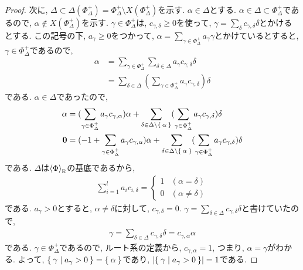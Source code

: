 \begin{proof}
  次に, $\Delta\subset \Delta(\Phi_\Delta^{+})=\Phi_\Delta^+\setminus X(\Phi_\Delta^+)$を示す.
  $\alpha\in\Delta$とする.
  $\alpha\in\Delta \subset \Phi_\Delta^+$であるので,
  $\alpha\not\in X(\Phi_\Delta^+)$を示す.
  $\gamma\in\Phi_\Delta^+$は,
  $c_{\gamma,\delta}\geq 0$を使って,
  $\gamma=\sum_{\delta}c_{\gamma,\delta}\delta$とかけるとする.
  この記号の下,
  $a_\gamma\geq 0$をつかって,
  $\alpha=\sum_{\gamma\in\Phi_\Delta^+}a_\gamma\gamma$とかけているとすると,
  $\gamma\in \Phi_\Delta^+$であるので,
  \begin{align*}
    \alpha
    &=\sum_{\gamma\in\Phi_\Delta^+}\sum_{\delta\in\Delta}a_\gamma c_{\gamma,\delta}\delta\\
    &=\sum_{\delta\in\Delta}(\sum_{\gamma\in\Phi_\Delta^+}a_\gamma c_{\gamma,\delta})\delta
  \end{align*}
  である. $\alpha\in\Delta$であったので,
  \begin{align*}
    \alpha
    &=
    (\sum_{\gamma\in\Phi_\Delta^+}a_\gamma c_{\gamma,\alpha})\alpha
    +\sum_{\delta\in\Delta\setminus\Set{\alpha}}(\sum_{\gamma\in\Phi_\Delta^+}a_\gamma c_{\gamma,\delta})\delta\\
    \boldsymbol{0}
    &=
    (-1+\sum_{\gamma\in\Phi_\Delta^+}a_\gamma c_{\gamma,\alpha})\alpha
    +\sum_{\delta\in\Delta\setminus\Set{\alpha}}(\sum_{\gamma\in\Phi_\Delta^+}a_\gamma c_{\gamma,\delta})\delta
  \end{align*}
  である. 
  $\Delta$は$\Braket{\Phi}_{\mathbb{R}}$の基底であるから,　
  \begin{align*}
    \sum_{i=1}^la_i c_{i,\delta}=
    \begin{cases}
      1 &  (\alpha=\delta)\\
      0 & (\alpha\neq\delta)
    \end{cases}
  \end{align*}
  である.
  $a_\gamma>0$とすると,
  $\alpha\neq\delta$に対して, $c_{\gamma,\delta}=0$.
  $\gamma=\sum_{\delta\in\Delta}c_{\gamma,\delta}\delta$と書けていたので,
  \begin{align*}
    \gamma=\sum_{\delta\in\Delta}c_{\gamma,\delta}\delta=c_{\gamma,\alpha}\alpha
  \end{align*}
  である.
  $\gamma\in\Phi_\Delta^+$であるので, ルート系の定義から,
  $c_{\gamma,\alpha}=1$, つまり, $\alpha=\gamma$がわかる.
  よって, $\Set{\gamma|a_\gamma>0}=\Set{\alpha}$であり,
  $\left|\Set{\gamma|a_\gamma>0}\right|=1$である.

\end{proof}

